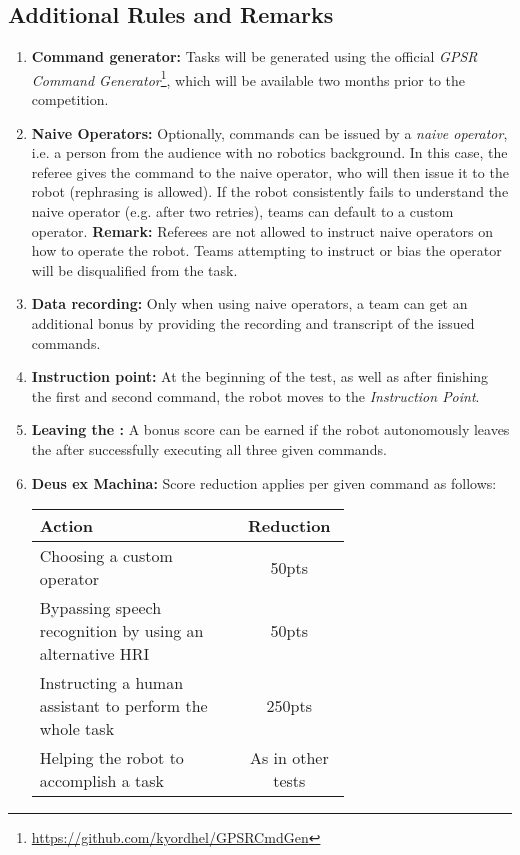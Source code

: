%
%
\subsection*{Additional Rules and Remarks}
\begin{enumerate}[nosep]
	\item \textbf{Command generator:} Tasks will be generated using the official \emph{GPSR Command Generator}\footnote{\url{https://github.com/kyordhel/GPSRCmdGen}}, which will be available two months prior to the competition.

	\item \textbf{Naive Operators:} Optionally, commands can be issued by a \emph{naive operator}, i.e. a person from the audience with no robotics background.
	In this case, the referee gives the command to the naive operator, who will then issue it to the robot (rephrasing is allowed).
	If the robot consistently fails to understand the naive operator (e.g. after two retries), teams can default to a custom operator.
	\textbf{Remark:} Referees are not allowed to instruct naive operators on how to operate the robot.
	Teams attempting to instruct or bias the operator will be disqualified from the task.

	\item \textbf{Data recording:} Only when using naive operators, a team can get an additional bonus by providing the recording and transcript of the issued commands.

	\item \textbf{Instruction point:} At the beginning of the test, as well as after finishing the first and second command, the robot moves to the \textit{Instruction Point}.

	\item \textbf{Leaving the \Arena{}:} A bonus score can be earned if the robot autonomously leaves the \Arena{} after successfully executing all three given commands.

	\item \textbf{Deus ex Machina:} Score reduction applies per given command as follows:
	\begin{table}[h]
		\begin{tabular}{m{0.65\linewidth} c}
			\textbf{Action} & \textbf{Reduction} \\\hline
			Choosing a custom operator & 50pts \\
			Bypassing speech recognition by using an alternative HRI & 50pts \\
			Instructing a human assistant to perform the whole task & 250pts \\
			Helping the robot to accomplish a task & As in other \SONE{} tests \\\hline
		\end{tabular}
	\end{table}
\end{enumerate}

